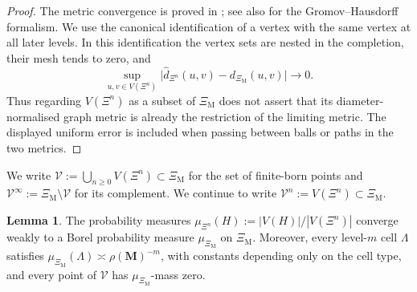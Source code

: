 \documentclass{article}
\theoremstyle{plain}
\theoremstyle{definition}
\newtheorem{lemma}[theorem]{Lemma}
\begin{document}
\begingroup\color{red}
\begin{proof}
The metric convergence is proved in \cite{neroli2024fractal}; see also
\cite{burago2001course,abraham2013note} for the Gromov--Hausdorff formalism.
We use the canonical identification of a vertex with the same vertex at all later levels.
In this identification the vertex sets are nested in the completion, their mesh tends to zero, and
\[
\sup_{u,v\in V(\Xi^n)}
\bigl|\hat d_{\Xi^n}(u,v)-d_{\Xi_{\mathrm M}}(u,v)\bigr|\longrightarrow0.
\]
Thus regarding $V(\Xi^n)$ as a subset of $\Xi_{\mathrm M}$ does not assert that its
diameter-normalised graph metric is already the restriction of the limiting metric.
The displayed uniform error is included when passing between balls or paths in the two metrics.
\end{proof}
\endgroup{}


We write $\mathscr V:=\bigcup_{n\ge 0}V(\Xi^n)\subset \Xi_{\mathrm M}$ for the set of finite-born points and $\mathscr V^\infty:=\Xi_{\mathrm M}\setminus \mathscr V$ for its complement.
We continue to write $\mathscr V^n:=V(\Xi^n)\subset \Xi_{\mathrm M}$.

\begin{lemma}\label{lem:GHP_convergence}
The probability measures $\mu_{\Xi^n}(H):=|V(H)|/|V(\Xi^n)|$ converge weakly to a Borel probability measure $\mu_{\Xi_{\mathrm M}}$ on $\Xi_{\mathrm M}$.
Moreover, every level-$m$ cell $\Lambda$ satisfies $\mu_{\Xi_{\mathrm M}}(\Lambda)\asymp \rho(\mathbf M)^{-m}$, with constants depending only on the cell type, and every point of $\mathscr V$ has $\mu_{\Xi_{\mathrm M}}$-mass zero.
\end{lemma}
\end{document}
